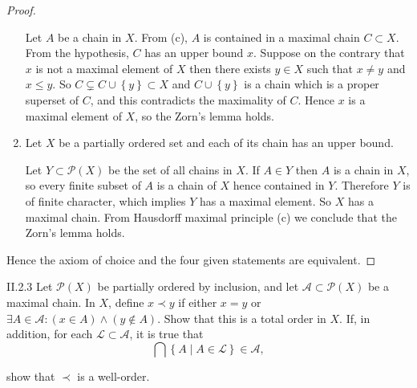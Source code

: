 \begin{proof}
\begin{enumerate}[label={(\alph*)}]
		      Let \( A \) be a chain in \( X \). From (c), \( A \) is contained in a maximal chain \( C \subset X \). From the hypothesis, \( C \) has an upper bound \( x \). Suppose on the contrary that \( x \) is not a maximal element of \( X \) then there exists \( y \in X \) such that \( x \ne y \) and \( x \leq y \). So \( C \subsetneq C \cup \left\{ y \right\} \subset X \) and \( C \cup \left\{ y \right\} \) is a chain which is a proper superset of \( C \), and this contradicts the maximality of \( C \). Hence \( x \) is a maximal element of \( X \), so the Zorn's lemma holds.
		\item Let \( X \) be a partially ordered set and each of its chain has an upper bound.

		      Let \( Y \subset \mathscr{P}(X) \) be the set of all chains in \( X \). If \( A \in Y \) then \( A \) is a chain in \( X \), so every finite subset of \( A \) is a chain of \( X \) hence contained in \( Y \). Therefore \( Y \) is of finite character, which implies \( Y \) has a maximal element. So \( X \) has a maximal chain. From Hausdorff maximal principle (c) we conclude that the Zorn's lemma holds.
	\end{enumerate}

	Hence the axiom of choice and the four given statements are equivalent.
\end{proof}

\begin{problem}{II.2.3}
Let \( \mathscr{P}(X) \) be partially ordered by inclusion, and let \( \mathscr{A} \subset \mathscr{P}(X) \) be a maximal chain. In \( X \), define \( x \prec y \) if either \( x = y \) or \( \exists A \in \mathscr{A}: (x \in A) \land (y \notin A) \). Show that this is a total order in \( X \). If, in addition, for each \( \mathscr{L} \subset \mathscr{A} \), it is true that
\[
	\bigcap \left\{ A \mid A \in \mathscr{L} \right\} \in \mathscr{A},
\]

show that \( \prec \) is a well-order.
\end{problem}

